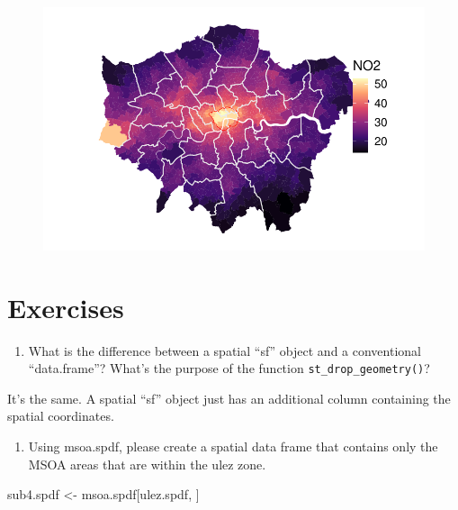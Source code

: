 \documentclass[
  letterpaper,
  DIV=11,
  numbers=noendperiod]{scrreprt}
\newenvironment{Shaded}{\begin{snugshade}}{\end{snugshade}}
\newcommand{\NormalTok}[1]{\textcolor[rgb]{0.00,0.23,0.31}{#1}}
\newcommand{\OtherTok}[1]{\textcolor[rgb]{0.00,0.23,0.31}{#1}}
\providecommand{\tightlist}{%
  \setlength{\itemsep}{0pt}\setlength{\parskip}{0pt}}\usepackage{longtable,booktabs,array}
\begin{document}
\begin{figure}[H]

{\centering \includegraphics{02_spatial-data_files/figure-pdf/unnamed-chunk-23-1.pdf}

}

\end{figure}

\hypertarget{exercises}{%
\section{Exercises}\label{exercises}}

\begin{enumerate}
\def\labelenumi{\arabic{enumi})}
\tightlist
\item
  What is the difference between a spatial ``sf'' object and a
  conventional ``data.frame''? What's the purpose of the function
  \texttt{st\_drop\_geometry()}?
\end{enumerate}

It's the same. A spatial ``sf'' object just has an additional column
containing the spatial coordinates.

\begin{enumerate}
\def\labelenumi{\arabic{enumi})}
\setcounter{enumi}{1}
\tightlist
\item
  Using msoa.spdf, please create a spatial data frame that contains only
  the MSOA areas that are within the ulez zone.
\end{enumerate}

\begin{Shaded}
\begin{Highlighting}[]
\NormalTok{sub4.spdf }\OtherTok{\textless{}{-}}\NormalTok{ msoa.spdf[ulez.spdf, ]}
\end{Highlighting}
\end{Shaded}
\end{document}
